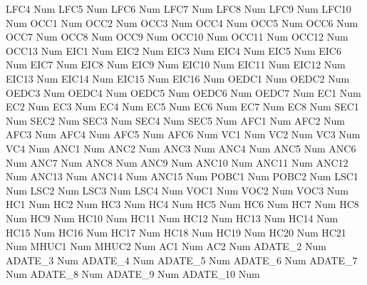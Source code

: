 \documentclass[
  11pt,
  a4paper,
  DIV=12,captions=tableheading,oneside,titlepage]{scrbook}
\let\oldverbatim\verbatim
\let\endoldverbatim\endverbatim
\renewenvironment{verbatim}{\footnotesize\oldverbatim}{\endoldverbatim}
\begin{document}
\begin{verbatim}
  LFC4        Num   
  LFC5        Num   
  LFC6        Num   
  LFC7        Num   
  LFC8        Num   
  LFC9        Num   
  LFC10       Num   
  OCC1        Num   
  OCC2        Num   
  OCC3        Num   
  OCC4        Num   
  OCC5        Num   
  OCC6        Num   
  OCC7        Num   
  OCC8        Num   
  OCC9        Num   
  OCC10       Num   
  OCC11       Num   
  OCC12       Num   
  OCC13       Num   
  EIC1        Num   
  EIC2        Num   
  EIC3        Num   
  EIC4        Num   
  EIC5        Num   
  EIC6        Num   
  EIC7        Num   
  EIC8        Num   
  EIC9        Num   
  EIC10       Num   
  EIC11       Num   
  EIC12       Num   
  EIC13       Num   
  EIC14       Num   
  EIC15       Num   
  EIC16       Num   
  OEDC1       Num   
  OEDC2       Num   
  OEDC3       Num   
  OEDC4       Num   
  OEDC5       Num   
  OEDC6       Num   
  OEDC7       Num   
  EC1         Num   
  EC2         Num   
  EC3         Num   
  EC4         Num   
  EC5         Num   
  EC6         Num   
  EC7         Num   
  EC8         Num   
  SEC1        Num   
  SEC2        Num   
  SEC3        Num   
  SEC4        Num   
  SEC5        Num   
  AFC1        Num   
  AFC2        Num   
  AFC3        Num   
  AFC4        Num   
  AFC5        Num   
  AFC6        Num   
  VC1         Num   
  VC2         Num   
  VC3         Num   
  VC4         Num   
  ANC1        Num   
  ANC2        Num   
  ANC3        Num   
  ANC4        Num   
  ANC5        Num   
  ANC6        Num   
  ANC7        Num   
  ANC8        Num   
  ANC9        Num   
  ANC10       Num   
  ANC11       Num   
  ANC12       Num   
  ANC13       Num   
  ANC14       Num   
  ANC15       Num   
  POBC1       Num   
  POBC2       Num   
  LSC1        Num   
  LSC2        Num   
  LSC3        Num   
  LSC4        Num   
  VOC1        Num   
  VOC2        Num   
  VOC3        Num   
  HC1         Num   
  HC2         Num   
  HC3         Num   
  HC4         Num   
  HC5         Num   
  HC6         Num   
  HC7         Num   
  HC8         Num   
  HC9         Num   
  HC10        Num   
  HC11        Num   
  HC12        Num   
  HC13        Num   
  HC14        Num   
  HC15        Num   
  HC16        Num   
  HC17        Num   
  HC18        Num   
  HC19        Num   
  HC20        Num   
  HC21        Num   
  MHUC1       Num   
  MHUC2       Num   
  AC1         Num   
  AC2         Num   
  ADATE_2     Num   
  ADATE_3     Num   
  ADATE_4     Num   
  ADATE_5     Num   
  ADATE_6     Num   
  ADATE_7     Num   
  ADATE_8     Num   
  ADATE_9     Num   
  ADATE_10    Num   

\end{verbatim}
\end{document}
